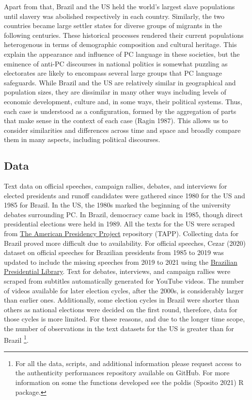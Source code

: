 \documentclass[smallextended]{svjour3}       %
\begin{document}
Apart from that, Brazil and the US held the world's largest slave
populations until slavery was abolished respectively in each country.
Similarly, the two countries became large settler states for diverse
groups of migrants in the following centuries. These historical
processes rendered their current populations heterogenous in terms of
demographic composition and cultural heritage. This explain the
appearance and influence of PC language in these societies, but the
eminence of anti-PC discourses in national politics is somewhat puzzling
as electorates are likely to encompass several large groups that PC
language safeguards. While Brazil and the US are relatively similar in
geographical and population sizes, they are dissimilar in many other
ways including levels of economic development, culture and, in some
ways, their political systems. Thus, each case is understood as a
configuration, formed by the aggregation of parts that make sense in the
context of each case (Ragin 1987). This allows us to consider
similarities and differences across time and space and broadly compare
them in many aspects, including political discourses.

\hypertarget{data}{%
\subsection{Data}\label{data}}

Text data on official speeches, campaign rallies, debates, and
interviews for elected presidents and runoff candidates were gathered
since 1980 for the US and 1985 for Brazil. In the US, the 1980s marked
the beginning of the university debates surrounding PC. In Brazil,
democracy came back in 1985, though direct presidential elections were
held in 1989. All the texts for the US were scraped from
\href{https://www.presidency.ucsb.edu}{The American Presidency Project}
repository (TAPP). Collecting data for Brazil proved more difficult due
to availability. For official speeches, Cezar (2020) dataset on official
speeches for Brazilian presidents from 1985 to 2019 was updated to
include the missing speeches from 2019 to 2021 using the
\href{http://www.biblioteca.presidencia.gov.br/sobre-a-biblioteca/biblioteca-da-presidencia-da-republica}{Brazilian
Presidential Library}. Text for debates, interviews, and campaign
rallies were scraped from subtitles automatically generated for YouTube
videos. The number of videos available for later election cycles, after
the 2000s, is considerably larger than earlier ones. Additionally, some
election cycles in Brazil were shorter than others as national elections
were decided on the first round, therefore, data for those cycles is
more limited. For these reasons, and due to the longer time scope, the
number of observations in the text datasets for the US is greater than
for Brazil \footnote{ For all the data, scripts, and additional
  information please request access to the authenticity performances
  repository available on GitHub. For more information on some the
  functions developed see the poldis (Sposito 2021) R package.}.
\end{document}
